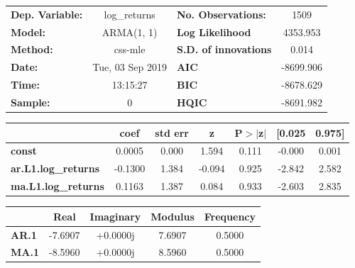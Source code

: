\begin{center}
\begin{tabular}{lclc}
\toprule
\textbf{Dep. Variable:}     &        log\_returns       & \textbf{  No. Observations:  } &            1509            \\
\textbf{Model:}             &         ARMA(1, 1)        & \textbf{  Log Likelihood     } &          4353.953          \\
\textbf{Method:}            &          css-mle          & \textbf{  S.D. of innovations} &           0.014            \\
\textbf{Date:}              &      Tue, 03 Sep 2019     & \textbf{  AIC                } &         -8699.906          \\
\textbf{Time:}              &          13:15:27         & \textbf{  BIC                } &         -8678.629          \\
\textbf{Sample:}            &             0             & \textbf{  HQIC               } &         -8691.982          \\
\bottomrule
\end{tabular}
\begin{tabular}{lcccccc}
                            & \textbf{coef} & \textbf{std err} & \textbf{z} & \textbf{P$> |$z$|$} & \textbf{[0.025} & \textbf{0.975]}  \\
\midrule
\textbf{const}              &       0.0005  &        0.000     &     1.594  &         0.111        &       -0.000    &        0.001     \\
\textbf{ar.L1.log\_returns} &      -0.1300  &        1.384     &    -0.094  &         0.925        &       -2.842    &        2.582     \\
\textbf{ma.L1.log\_returns} &       0.1163  &        1.387     &     0.084  &         0.933        &       -2.603    &        2.835     \\
\bottomrule
\end{tabular}
\begin{tabular}{lcccc}
              & \textbf{            Real} & \textbf{         Imaginary} & \textbf{         Modulus} & \textbf{        Frequency}  \\
\midrule
\textbf{AR.1} &               -7.6907     &                +0.0000j     &                7.6907     &                0.5000       \\
\textbf{MA.1} &               -8.5960     &                +0.0000j     &                8.5960     &                0.5000       \\
\bottomrule
\end{tabular}
\end{center}
